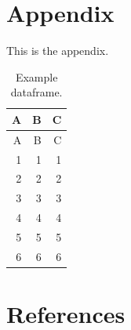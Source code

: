 \documentclass[
  notoc %
]{tufte-book}
\begin{document}
\hypertarget{appendix}{%
\chapter*{Appendix}\label{appendix}}

This is the appendix.

\hypertarget{tbl:example_dataframe}{}
\begin{longtable}[]{@{}rrr@{}}
\caption{\label{tbl:example_dataframe}Example dataframe.}\tabularnewline
\toprule
A & B & C \\
\midrule
\endfirsthead
\toprule
A & B & C \\
\midrule
\endhead
1 & 1 & 1 \\
2 & 2 & 2 \\
3 & 3 & 3 \\
4 & 4 & 4 \\
5 & 5 & 5 \\
6 & 6 & 6 \\
\bottomrule
\end{longtable}

\hypertarget{references}{%
\chapter*{References}\label{references}}
\end{document}
